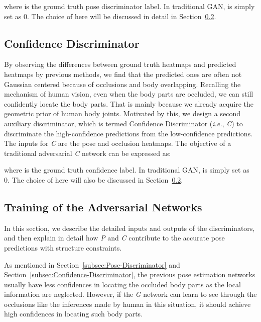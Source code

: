 \documentclass[10pt,letterpaper,twocolumn]{article}
\begin{document}
where  is the ground truth pose discriminator label. In traditional GAN,   is simply set as 0. The choice of  here will be discussed in detail in Section~\ref{subsec:Geometric-Constrained-Training}.

\subsection{Confidence Discriminator\label{subsec:Confidence-Discriminator}}

By observing the differences between ground truth heatmaps and predicted heatmaps by previous methods, we find that the predicted ones are often
not Gaussian centered because of occlusions and body overlapping. Recalling the mechanism of human vision, even when the body parts are occluded,
we can still confidently locate the body parts. That is mainly because we already acquire  the geometric prior of human body joints. Motivated by this, we design a second  auxiliary discriminator, which is termed Confidence Discriminator (\emph{i.e.}, \textit{C}) to discriminate the high-confidence predictions from the low-confidence predictions. The inputs for \textit{C} are the pose and occlusion heatmaps. The objective of a traditional adversarial \textit{C} network can be expressed as:

where  is the ground truth confidence label. In traditional GAN,   is simply set as 0. The choice of  here will also be discussed in Section~\ref{subsec:Geometric-Constrained-Training}.

\subsection{Training of the Adversarial Networks}\label{subsec:Geometric-Constrained-Training}

In this section, we describe the detailed inputs and outputs of the discriminators, and then explain in detail how \textit{P} and \textit{C} contribute to the accurate pose predictions with structure constraints.

As mentioned in Section~\ref{subsec:Pose-Discriminator} and Section~\ref{subsec:Confidence-Discriminator}, the previous pose estimation networks usually have less confidences in locating the occluded body parts as the local information are neglected. However, if the \textit{G} network can learn to see through the occlusions like the inferences made by human in this situation, it should  achieve high confidences in locating such body parts.
\end{document}
